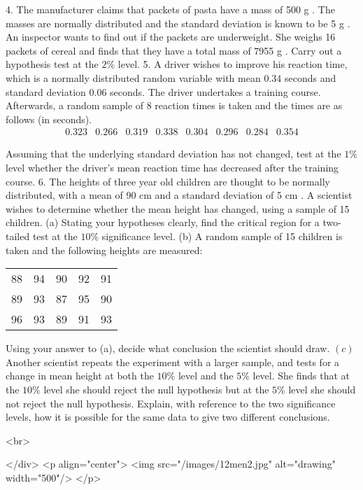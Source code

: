 4. The manufacturer claims that packets of pasta have a mass of 500 g . The masses are normally distributed and the standard deviation is known to be 5 g . An inspector wants to find out if the packets are underweight. She weighs 16 packets of cereal and finds that they have a total mass of 7955 g . Carry out a hypothesis test at the $2 \%$ level.
5. A driver wishes to improve his reaction time, which is a normally distributed random variable with mean 0.34 seconds and standard deviation 0.06 seconds. The driver undertakes a training course. Afterwards, a random sample of 8 reaction times is taken and the times are as follows (in seconds).
$$
\begin{array}{llllllll}
0.323 & 0.266 & 0.319 & 0.338 & 0.304 & 0.296 & 0.284 & 0.354
\end{array}
$$

Assuming that the underlying standard deviation has not changed, test at the $1 \%$ level whether the driver's mean reaction time has decreased after the training course.
6. The heights of three year old children are thought to be normally distributed, with a mean of 90 cm and a standard deviation of 5 cm . A scientist wishes to determine whether the mean height has changed, using a sample of 15 children.
(a) Stating your hypotheses clearly, find the critical region for a two-tailed test at the $10 \%$ significance level.
(b) A random sample of 15 children is taken and the following heights are measured:

\begin{tabular}{ccccc}
88 & 94 & 90 & 92 & 91 \\
89 & 93 & 87 & 95 & 90 \\
96 & 93 & 89 & 91 & 93
\end{tabular}

Using your answer to (a), decide what conclusion the scientist should draw.
\((c)\) Another scientist repeats the experiment with a larger sample, and tests for a change in mean height at both the $10 \%$ level and the $5 \%$ level. She finds that at the $10 \%$ level she should reject the null hypothesis but at the $5 \%$ level she should not reject the null hypothesis. Explain, with reference to the two significance levels, how it is possible for the same data to give two different conclusions.

<br>

</div>
<p align="center">
<img src="/images/12men2.jpg" alt="drawing" width="500"/>
</p>
